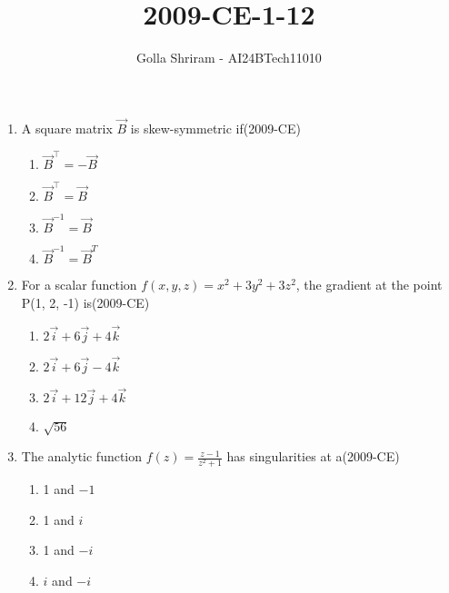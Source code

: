 \documentclass[journal,12pt,twocolumn]{IEEEtran}
\theoremstyle{remark}
\begin{document}

\onecolumn
\vspace{3cm}
\title{ 2009-CE-1-12 }
\author{Golla Shriram - AI24BTech11010}

\maketitle

\renewcommand{\thefigure}{\theenumi}
\renewcommand{\thetable}{\theenumi}


                                                                           
 \begin{enumerate}
		 
	 \item A square matrix $\vec{B}$ is skew-symmetric if\hfill{(2009-CE)}

 \begin{enumerate}
  \item $\vec{B}^{\top} = - \vec{B}$
  \item $\vec{B}^{\top} = \vec{B}$
  \item $\vec{B}^{-1} =  \vec{B}$
  \item $\vec{B}^{-1} =  \vec{B}^{T}$
 \end{enumerate}

\item For a scalar function $f(x,y,z) = x^2+3y^2+3z^2$, the gradient at the point P(1, 2, -1) is\hfill{(2009-CE)}

\begin{enumerate}
	\item $2\overrightarrow{i}+6\overrightarrow{j}+4\overrightarrow{k} $
	\item $2\overrightarrow{i}+6\overrightarrow{j}-4\overrightarrow{k} $
	\item $2\overrightarrow{i}+12\overrightarrow{j}+4\overrightarrow{k} $
	\item $\sqrt{56}$
\end{enumerate}

\item The analytic function $f(z) = \frac{z-1}{z^{2}+1}$ has singularities at a\hfill{(2009-CE)}

	\begin{enumerate}
	\item 1 and $-1$
	\item 1 and $i$
	\item 1 and $-i$
	\item $i$ and $-i$
	\end{enumerate}



\end{enumerate}
\end{document}
